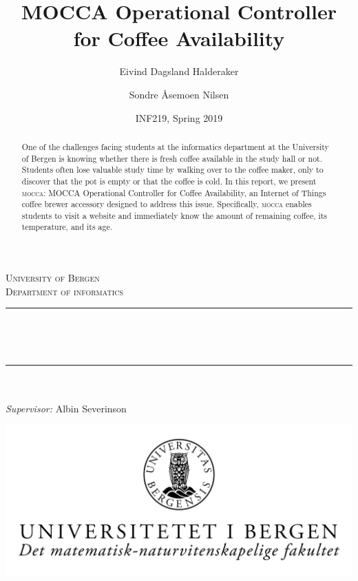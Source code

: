 \documentclass[12pt,a4paper,oneside,article]{memoir}
\title{MOCCA Operational Controller for Coffee Availability}
\author{Eivind Dagsland Halderaker \and Sondre Åsemoen Nilsen}
\date{INF219, Spring 2019}
\numberwithin{equation}{chapter}
\begin{document}
\begin{titlingpage}

\newcommand{\HRule}{\rule{\linewidth}{0.5mm}}
\centering

\textsc{\LARGE University of Bergen \\ Department of informatics}\\[1.5cm] %

\HRule\\[0.5cm]
\begin{Huge}
	\bfseries{\thetitle}\\[0.7cm]
\end{Huge}
\HRule\\[0.5cm]

{\large \theauthor}\\
{\large \emph{Supervisor:} Albin Severinson\\[2cm]}

\centerline{\includegraphics[scale=1.9]{figures/canvasWithFaculty}}
{\large \thedate}\\[3cm]
\vfill

\begin{abstract}
  One of the challenges facing students at the informatics department at the
  University of Bergen is knowing whether there is fresh coffee available in the
  study hall or not. Students often lose valuable study time by walking over to
  the coffee maker, only to discover that the pot is empty or that the coffee is
  cold. In this report, we present \textsc{mocca}: MOCCA Operational Controller
  for Coffee Availability, an Internet of Things coffee brewer accessory
  designed to address this issue. Specifically, \textsc{mocca} enables students
  to visit a website and immediately know the amount of remaining coffee, its
  temperature, and its age.
\end{abstract}
\end{titlingpage}

\clearpage
\end{document}
